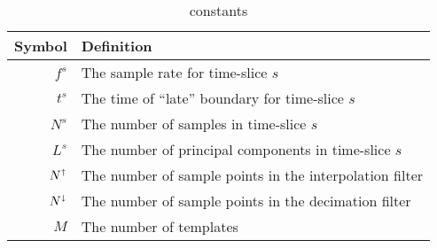 \documentclass[letterpaper,11pt]{article}
\begin{document}
\begin{table}
\begin{tabular}{rl}
\hline
\textbf{Symbol} & \textbf{Definition} \\\hline
$f^{s}$ & The sample rate for time-slice $s$\\
$t^{s}$ & The time of ``late'' boundary for time-slice $s$\\
$N^{s}$ & The number of samples in time-slice $s$\\
$L^{s}$ & The number of principal components in time-slice $s$\\
$N^\shortuparrow$ & The number of sample points in the interpolation filter\\
$N^\shortdownarrow$ & The number of sample points in the decimation filter\\
$M$ & The number of templates\\
\hline
\end{tabular}
\caption{constants}
\end{table}
\end{document}
